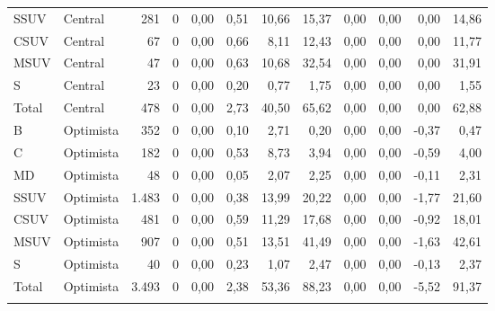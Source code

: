 \begin{longtable}{@{}llrrrrrrrrrr@{}}
SSUV & Central & 281 & 0 & 0,00 & 0,51 & 10,66 & 15,37 & 0,00 & 0,00 & 0,00 & 14,86 \\
CSUV & Central & 67 & 0 & 0,00 & 0,66 & 8,11 & 12,43 & 0,00 & 0,00 & 0,00 & 11,77 \\
MSUV & Central & 47 & 0 & 0,00 & 0,63 & 10,68 & 32,54 & 0,00 & 0,00 & 0,00 & 31,91 \\
S & Central & 23 & 0 & 0,00 & 0,20 & 0,77 & 1,75 & 0,00 & 0,00 & 0,00 & 1,55 \\
\rowcolor{fondo}
Total & Central & 478 & 0 & 0,00 & 2,73 & 40,50 & 65,62 & 0,00 & 0,00 & 0,00 & 62,88 \\
\addlinespace[5pt]
B & Optimista & 352 & 0 & 0,00 & 0,10 & 2,71 & 0,20 & 0,00 & 0,00 & -0,37 & 0,47 \\
C & Optimista & 182 & 0 & 0,00 & 0,53 & 8,73 & 3,94 & 0,00 & 0,00 & -0,59 & 4,00 \\
MD & Optimista & 48 & 0 & 0,00 & 0,05 & 2,07 & 2,25 & 0,00 & 0,00 & -0,11 & 2,31 \\
SSUV & Optimista & 1.483 & 0 & 0,00 & 0,38 & 13,99 & 20,22 & 0,00 & 0,00 & -1,77 & 21,60 \\
CSUV & Optimista & 481 & 0 & 0,00 & 0,59 & 11,29 & 17,68 & 0,00 & 0,00 & -0,92 & 18,01 \\
MSUV & Optimista & 907 & 0 & 0,00 & 0,51 & 13,51 & 41,49 & 0,00 & 0,00 & -1,63 & 42,61 \\
S & Optimista & 40 & 0 & 0,00 & 0,23 & 1,07 & 2,47 & 0,00 & 0,00 & -0,13 & 2,37 \\
\rowcolor{fondo}
Total & Optimista & 3.493 & 0 & 0,00 & 2,38 & 53,36 & 88,23 & 0,00 & 0,00 & -5,52 & 91,37 \\
\addlinespace[5pt]
\end{longtable}
